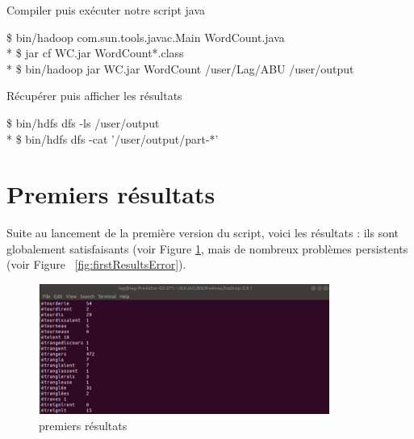 \documentclass{article}
\begin{document}
\begin{enumerate}
\begin{item}
\end{item}
\begin{item}
Compiler puis ex\'{e}cuter notre script java
\begin{tcolorbox}
\$ bin/hadoop com.sun.tools.javac.Main WordCount.java \\*
\$ jar cf WC.jar WordCount*.class \\*
\$ bin/hadoop jar WC.jar WordCount /user/Lag/ABU /user/output
\end{tcolorbox}
\end{item}
\begin{item}
R\'{e}cup\'{e}rer puis afficher les r\'{e}sultats
\begin{tcolorbox}
\$ bin/hdfs dfs -ls /user/output \\*
\$ bin/hdfs dfs -cat '/user/output/part-*'
\end{tcolorbox}
\end{item}
\end{enumerate}


\section{Premiers r\'{e}sultats}

Suite au lancement de la premi\`{e}re version du script, voici les r\'{e}sultats : ils sont globalement satisfaisants (voir Figure \ref{fig:firstResultsErrorLess}, mais de nombreux probl\`{e}mes persistents (voir Figure ~\ref{fig:firstResultsError}).

\begin{figure}[h]
\begin{center}
\includegraphics[width=0.85\textwidth]{console_resultat_2}
\caption{premiers r\'{e}sultats}
\label{fig:firstResultsErrorLess}
\end{center}
\end{figure}
\end{document}
